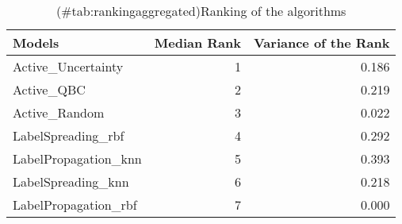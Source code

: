 \begin{table}[!h]

\caption{(\#tab:rankingaggregated)Ranking of the algorithms}
\centering
\begin{tabular}[t]{lrr}
\toprule
Models & Median Rank & Variance of the Rank\\
\midrule
Active\_Uncertainty & 1 & 0.186\\
Active\_QBC & 2 & 0.219\\
Active\_Random & 3 & 0.022\\
LabelSpreading\_rbf & 4 & 0.292\\
LabelPropagation\_knn & 5 & 0.393\\
LabelSpreading\_knn & 6 & 0.218\\
LabelPropagation\_rbf & 7 & 0.000\\
\bottomrule
\end{tabular}
\end{table}
